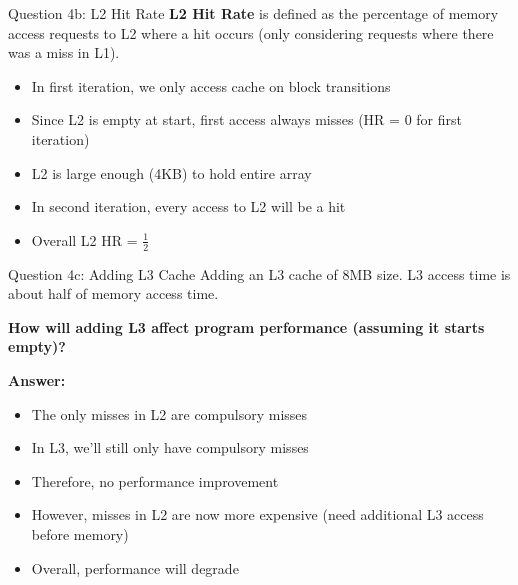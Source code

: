 \documentclass[aspectratio=169,12pt]{beamer}
\begin{document}
\begin{frame}{Question 4b: L2 Hit Rate}
\textbf{L2 Hit Rate} is defined as the percentage of memory access requests to L2 where a hit occurs (only considering requests where there was a miss in L1).

\begin{itemize}
    \item In first iteration, we only access cache on block transitions
    \item Since L2 is empty at start, first access always misses (HR = 0 for first iteration)
    \item L2 is large enough (4KB) to hold entire array
    \item In second iteration, every access to L2 will be a hit
    \item Overall L2 HR = $\frac{1}{2}$
\end{itemize}
\end{frame}

\begin{frame}{Question 4c: Adding L3 Cache}
Adding an L3 cache of 8MB size. L3 access time is about half of memory access time.

\textbf{How will adding L3 affect program performance (assuming it starts empty)?}

\textbf{Answer:}
\begin{itemize}
    \item The only misses in L2 are compulsory misses
    \item In L3, we'll still only have compulsory misses
    \item Therefore, no performance improvement
    \item However, misses in L2 are now more expensive (need additional L3 access before memory)
    \item Overall, performance will degrade
\end{itemize}
\end{frame}
\end{document}
